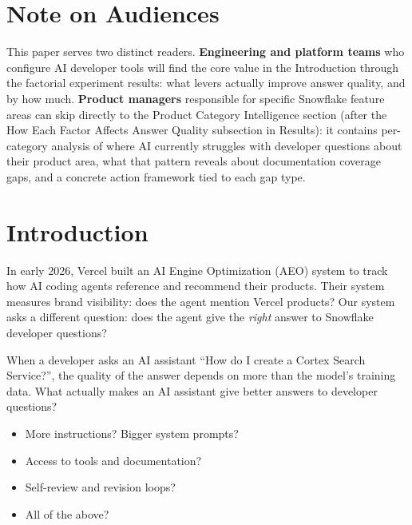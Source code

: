 \documentclass[10pt,letterpaper]{article}
\begin{document}
\section{Note on Audiences}

This paper serves two distinct readers. \textbf{Engineering and platform teams} who configure AI developer tools will find the core value in the Introduction through the factorial experiment results: what levers actually improve answer quality, and by how much. \textbf{Product managers} responsible for specific Snowflake feature areas can skip directly to the Product Category Intelligence section (after the How Each Factor Affects Answer Quality subsection in Results): it contains per-category analysis of where AI currently struggles with developer questions about their product area, what that pattern reveals about documentation coverage gaps, and a concrete action framework tied to each gap type.

\linenumbers

\section{Introduction}

In early 2026, Vercel built an AI Engine Optimization (AEO) system to track how AI coding agents reference and recommend their products. Their system measures brand visibility: does the agent mention Vercel products? Our system asks a different question: does the agent give the \emph{right} answer to Snowflake developer questions?

When a developer asks an AI assistant ``How do I create a Cortex Search Service?'', the quality of the answer depends on more than the model's training data. What actually makes an AI assistant give better answers to developer questions?

\begin{itemize}[nosep]
  \item More instructions? Bigger system prompts?
  \item Access to tools and documentation?
  \item Self-review and revision loops?
  \item All of the above?
\end{itemize}
\end{document}
